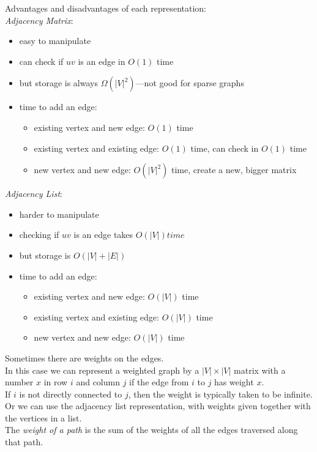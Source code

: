 \documentclass[12pt]{article}
\theoremstyle{plain}
\theoremstyle{definition}
\begin{document}
Advantages and disadvantages of each representation: \\
\emph{Adjacency Matrix}:
\begin{itemize}
  \item easy to manipulate
  \item can check if $uv$ is an edge in $O(1)$ time
  \item but storage is always $\Omega(|V|^{2})$---not good for sparse graphs
  \item time to add an edge:
  \begin{itemize}
    \item existing vertex and new edge: $O(1)$ time
    \item existing vertex and existing edge: $O(1)$ time, can check in $O(1)$ time
    \item new vertex and new edge: $O(|V|^{2})$ time, create a new, bigger matrix
  \end{itemize}
\end{itemize}

\emph{Adjacency List}:
\begin{itemize}
  \item harder to manipulate
  \item checking if $uv$ is an edge takes $O(|V|) time$
  \item but storage is $O(|V| + |E|)$
  \item time to add an edge:
  \begin{itemize}
    \item existing vertex and new edge: $O(|V|)$ time
    \item existing vertex and existing edge: $O(|V|)$ time
    \item new vertex and new edge: $O(|V|)$ time
  \end{itemize}
\end{itemize}

Sometimes there are weights on the edges. \\
In this case we can represent a weighted graph by a $|V| \times |V|$ matrix with a number $x$ in row $i$ and column $j$ if the edge from $i$ to $j$ has weight $x$. \\
If $i$ is not directly connected to $j$, then the weight is typically taken to be infinite. \\
Or we can use the adjacency list representation, with weights given together with the vertices in a list. \\

The \emph{weight of a path} is the sum of the weights of all the edges traversed along that path.
\end{document}
